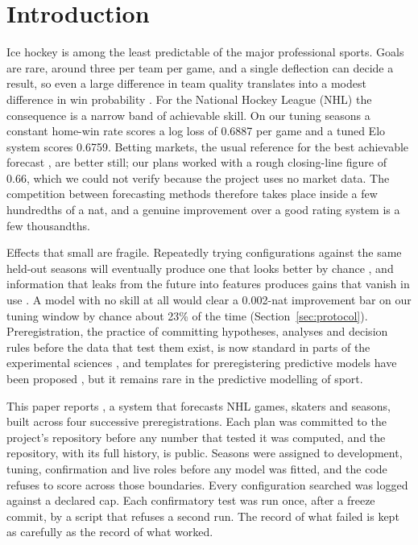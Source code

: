 \section{Introduction}
\label{sec:intro}

Ice hockey is among the least predictable of the major professional sports.
Goals are rare, around three per team per game, and a single deflection can
decide a result, so even a large difference in team quality translates into a
modest difference in win probability \citep{bennaim2006parity,lopez2018often}. For the
National Hockey League (NHL) the consequence is a narrow band of achievable
skill. On our tuning seasons a constant home-win rate scores a log loss of
0.6887 per game and a tuned Elo system \citep{elo1978rating,hvattum2010using}
scores 0.6759. Betting markets, the usual reference for the best achievable
forecast \citep{strumbelj2014determining}, are better still; our plans worked
with a rough closing-line figure of 0.66, which we could not verify because
the project uses no market data. The competition between forecasting methods
therefore takes place inside a few hundredths of a nat, and a genuine
improvement over a good rating system is a few thousandths.

Effects that small are fragile. Repeatedly trying configurations against the
same held-out seasons will eventually produce one that looks better by chance
\citep{simmons2011false,gelman2014statistical}, and information that leaks from
the future into features produces gains that vanish in use
\citep{kaufman2012leakage,kapoor2023leakage}. A model with no skill at all
would clear a 0.002-nat improvement bar on our tuning window by chance about
23\% of the time (Section~\ref{sec:protocol}). Preregistration, the practice of
committing hypotheses, analyses and decision rules before the data that test
them exist, is now standard in parts of the experimental sciences
\citep{nosek2018preregistration}, and templates for preregistering predictive
models have been proposed \citep{hofman2023preregistration}, but it remains
rare in the predictive modelling of sport.

This paper reports \neurhl{}, a system that forecasts NHL games, skaters and
seasons, built across four successive preregistrations. Each plan was committed
to the project's repository before any number that tested it was computed, and
the repository, with its full history, is public. Seasons
were assigned to development, tuning, confirmation and live roles before any
model was fitted, and the code refuses to score across those boundaries. Every
configuration searched was logged against a declared cap. Each confirmatory
test was run once, after a freeze commit, by a script that refuses a second
run. The record of what failed is kept as carefully as the record of what
worked.

